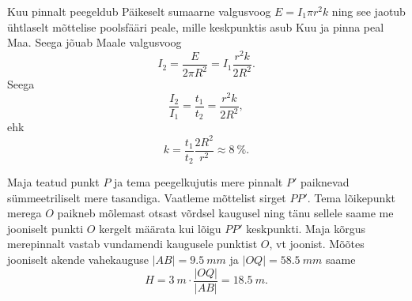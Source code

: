 \documentclass[10pt, twoside]{article}
\begin{document}
{Kuu pinnalt peegeldub Päikeselt sumaarne valgusvoog $E = I_1 \pi r^2k$ ning see jaotub ühtlaselt mõttelise poolsfääri peale, mille keskpunktis asub Kuu ja pinna peal Maa. Seega jõuab Maale valgusvoog
\[
I_2 = \frac{E}{2\pi R^2} = I_1 \frac{r^2k}{2R^2}.
\]
Seega
\[
\frac{I_2}{I_1} = \frac{t_1}{t_2} = \frac{r^2k}{2R^2},
\]
ehk
\[
k = \frac{t_1}{t_2} \frac{2R^2}{r^2} \approx \SI{8}{\%}.
\]
\probend
\bigskip


\solu
Maja teatud punkt $P$ ja tema peegelkujutis mere pinnalt $P'$ paiknevad sümmeetriliselt mere tasandiga. Vaatleme mõttelist sirget $PP'$. Tema lõikepunkt merega $O$ paikneb mõlemast otsast võrdsel kaugusel ning tänu sellele saame me jooniselt punkti $O$ kergelt määrata kui lõigu $PP'$ keskpunkti. Maja kõrgus merepinnalt vastab vundamendi kaugusele punktist $O$, vt joonist. Mõõtes jooniselt akende vahekauguse $|AB| = \SI{9,5}{mm}$ ja $|OQ| = \SI{58,5}{mm}$ saame
\[
H = \SI{3}{m} \cdot \frac{|OQ|}{|AB|} = \SI{18,5}{m}.
\]

}
\end{document}
